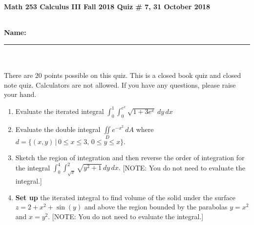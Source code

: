 \documentclass[11pt]{article}
\theoremstyle{remark}
\renewcommand{\d}{\displaystyle}
\begin{document}
{\bf Math 253 Calculus III Fall 2018 \hfill Quiz \# 7,  31 October 2018 }\\
\\
{\bf Name: \rule{3.5in}{1pt}}\\
\\
\noindent There are 20 points possible on this quiz. This is a closed
book quiz and closed note quiz. Calculators are not allowed. If you have any questions, please
raise your hand.

\begin{enumerate}
\item Evaluate the iterated integral $\d{\int_0^1 \int_0^{e^x} \sqrt{1+3e^x} \,dy \, dx}$
\vfill
\item Evaluate the double integral $\d{\iint\limits_D e^{-x^2}\,dA}$ where $d=\{(x,y)\, | \, 0 \leq x \leq 3, \, 0 \leq y \leq x\}.$
\vfill
\newpage
\item Sketch the region of integration and then reverse the order of integration for the integral $\d{\int_0^4 \int_{\sqrt{x}}^2 \sqrt{y^2+1} \,dy\,dx}.$ [NOTE: You do not need to evaluate the integral.]
\vfill
\item \textbf{Set up} the iterated integral to find volume of the solid under the surface $z=2+x^2+\sin (y)$ and above the region bounded by the parabolas $y=x^2$ and $x=y^2.$  [NOTE: You do not need to evaluate the integral.]

\vfill
\end{enumerate}
\end{document}
